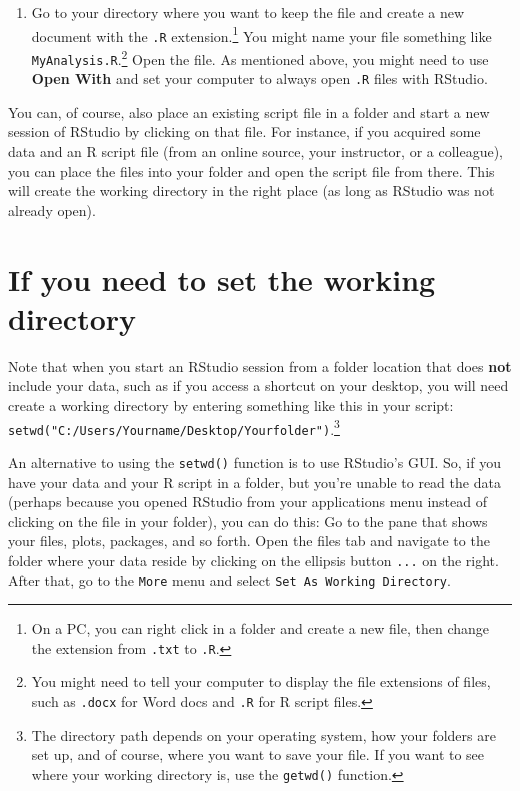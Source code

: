 \documentclass[
]{book}
\providecommand{\tightlist}{%
  \setlength{\itemsep}{0pt}\setlength{\parskip}{0pt}}
\begin{document}
\begin{enumerate}
\def\labelenumi{\arabic{enumi}.}
\setcounter{enumi}{1}
\tightlist
\item
  Go to your directory where you want to keep the file and create a new document with the \texttt{.R} extension.\footnote{On a PC, you can right click in a folder and create a new file, then change the extension from \texttt{.txt} to \texttt{.R}.} You might name your file something like \texttt{MyAnalysis.R}.\footnote{You might need to tell your computer to display the file extensions of files, such as \texttt{.docx} for Word docs and \texttt{.R} for R script files.} Open the file. As mentioned above, you might need to use \textbf{Open With} and set your computer to always open \texttt{.R} files with RStudio.
\end{enumerate}

You can, of course, also place an existing script file in a folder and start a new session of RStudio by clicking on that file. For instance, if you acquired some data and an R script file (from an online source, your instructor, or a colleague), you can place the files into your folder and open the script file from there. This will create the working directory in the right place (as long as RStudio was not already open).

\hypertarget{if-you-need-to-set-the-working-directory}{%
\section{If you need to set the working directory}\label{if-you-need-to-set-the-working-directory}}

Note that when you start an RStudio session from a folder location that does \textbf{not} include your data, such as if you access a shortcut on your desktop, you will need create a working directory by entering something like this in your script: \texttt{setwd("C:/Users/Yourname/Desktop/Yourfolder")}.\footnote{The directory path depends on your operating system, how your folders are set up, and of course, where you want to save your file. If you want to see where your working directory is, use the \texttt{getwd()} function.}

An alternative to using the \texttt{setwd()} function is to use RStudio's GUI. So, if you have your data and your R script in a folder, but you're unable to read the data (perhaps because you opened RStudio from your applications menu instead of clicking on the file in your folder), you can do this: Go to the pane that shows your files, plots, packages, and so forth. Open the files tab and navigate to the folder where your data reside by clicking on the ellipsis button \texttt{...} on the right. After that, go to the \texttt{More} menu and select \texttt{Set\ As\ Working\ Directory}.
\end{document}
